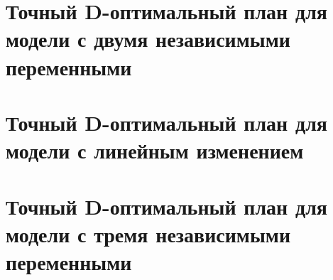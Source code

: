 \section{Точный D-оптимальный план для модели с двумя независимыми переменными}
\label{chapter2/diploma-section-2-1}


\section{Точный D-оптимальный план для модели с линейным изменением}
\label{chapter2/diploma-section-2-2}


\section{Точный D-оптимальный план для модели с тремя независимыми переменными}
\label{chapter2/diploma-section-2-3}


